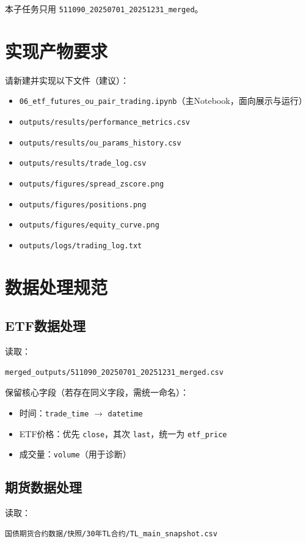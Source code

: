 \documentclass[11pt]{article}
\begin{document}
本子任务只用 \texttt{511090\_20250701\_20251231\_merged}。

\section{实现产物要求}
请新建并实现以下文件（建议）：
\begin{itemize}
  \item \texttt{06\_etf\_futures\_ou\_pair\_trading.ipynb}（主Notebook，面向展示与运行）
  \item \texttt{outputs/results/performance\_metrics.csv}
  \item \texttt{outputs/results/ou\_params\_history.csv}
  \item \texttt{outputs/results/trade\_log.csv}
  \item \texttt{outputs/figures/spread\_zscore.png}
  \item \texttt{outputs/figures/positions.png}
  \item \texttt{outputs/figures/equity\_curve.png}
  \item \texttt{outputs/logs/trading\_log.txt}
\end{itemize}

\section{数据处理规范}
\subsection{ETF数据处理}
读取：
\begin{lstlisting}
merged_outputs/511090_20250701_20251231_merged.csv
\end{lstlisting}

保留核心字段（若存在同义字段，需统一命名）：
\begin{itemize}
  \item 时间：\texttt{trade\_time} $\rightarrow$ \texttt{datetime}
  \item ETF价格：优先 \texttt{close}，其次 \texttt{last}，统一为 \texttt{etf\_price}
  \item 成交量：\texttt{volume}（用于诊断）
\end{itemize}

\subsection{期货数据处理}
读取：
\begin{lstlisting}
国债期货合约数据/快照/30年TL合约/TL_main_snapshot.csv
\end{lstlisting}
\end{document}
